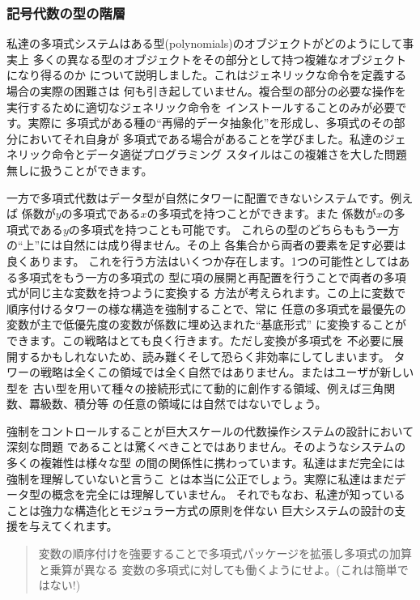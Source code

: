 \subsubsection*{記号代数の型の階層}

私達の多項式システムはある型(polynomials)のオブジェクトがどのようにして事実上
多くの異なる型のオブジェクトをその部分として持つ複雑なオブジェクトになり得るのか
について説明しました。これはジェネリックな命令を定義する場合の実際の困難さは
何も引き起していません。複合型の部分の必要な操作を実行するために適切なジェネリック命令を
インストールすることのみが必要です。実際に
多項式がある種の``再帰的データ抽象化''を形成し、多項式のその部分においてそれ自身が
多項式である場合があることを学びました。私達のジェネリック命令とデータ適従プログラミング
スタイルはこの複雑さを大した問題無しに扱うことができます。


一方で多項式代数はデータ型が自然にタワーに配置できないシステムです。例えば
係数が\( y \)の多項式である\( x \)の多項式を持つことができます。また
係数が\( x \)の多項式である\( y \)の多項式を持つことも可能です。
これらの型のどちらももう一方の``上''には自然には成り得ません。その上
各集合から両者の要素を足す必要は良くあります。
これを行う方法はいくつか存在します。1つの可能性としてはある多項式をもう一方の多項式の
型に項の展開と再配置を行うことで両者の多項式が同じ主な変数を持つように変換する
方法が考えられます。この上に変数で順序付けるタワーの様な構造を強制することで、常に
任意の多項式を最優先の変数が主で低優先度の変数が係数に埋め込まれた``基底形式''
に変換することができます。この戦略はとても良く行きます。ただし変換が多項式を
不必要に展開するかもしれないため、読み難くそして恐らく非効率にしてしまいます。
タワーの戦略は全くこの領域では全く自然ではありません。またはユーザが新しい型を
古い型を用いて種々の接続形式にて動的に創作する領域、例えば三角関数、羃級数、積分等
の任意の領域には自然ではないでしょう。



強制をコントロールすることが巨大スケールの代数操作システムの設計において深刻な問題
であることは驚くべきことではありません。そのようなシステムの多くの複雑性は様々な型
の間の関係性に携わっています。私達はまだ完全には強制を理解していないと言うこ
とは本当に公正でしょう。実際に私達はまだデータ型の概念を完全には理解していません。
それでもなお、私達が知っていることは強力な構造化とモジュラー方式の原則を伴ない
巨大システムの設計の支援を与えてくれます。

\begin{quote}
変数の順序付けを強要することで多項式パッケージを拡張し多項式の加算と乗算が異なる
変数の多項式に対しても働くようにせよ。(これは簡単ではない!)
\end{quote}

